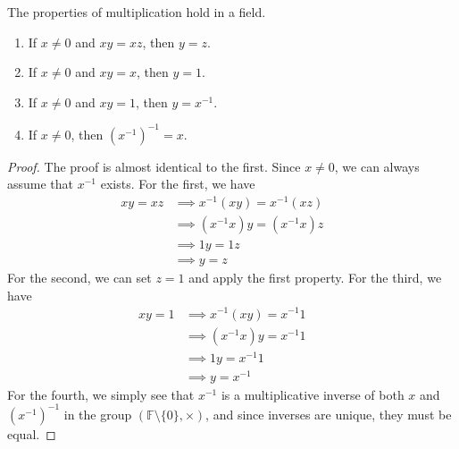   \begin{lemma}
    The properties of multiplication hold in a field. 
    \begin{enumerate}
      \item If $x \neq 0$ and $xy = xz$, then $y = z$. 
      \item If $x \neq 0$ and $xy = x$, then $y = 1$. 
      \item If $x \neq 0$ and $xy = 1$, then $y = x^{-1}$. 
      \item If $x \neq 0$, then $(x^{-1})^{-1} = x$. 
    \end{enumerate}
  \end{lemma}
  \begin{proof}
    The proof is almost identical to the first. Since $x \neq 0$, we can always assume that $x^{-1}$ exists. For the first, we have
    \begin{align}
      x y = x z & \implies x^{-1} (x y) = x^{-1} (x z) && \tag{multiplication is a function} \\
                & \implies (x^{-1} x) y = (x^{-1} x) z && \tag{$\times$ is associative} \\
                & \implies 1 y = 1 z && \tag{definition of multiplicative inverse} \\  
                & \implies y = z && \tag{definition of identity}
    \end{align}
    For the second, we can set $z = 1$ and apply the first property. For the third, we have 
    \begin{align}
      xy = 1 & \implies x^{-1} (x y) = x^{-1} 1 && \tag{multiplication is a function} \\
             & \implies (x^{-1} x) y = x^{-1} 1 && \tag{$\times$ is associative} \\
             & \implies 1 y = x^{-1} 1 && \tag{definition of multiplicative inverse} \\
             & \implies y = x^{-1} && \tag{definition of identity}
    \end{align}
    For the fourth, we simply see that $x^{-1}$ is a multiplicative inverse of both $x$ and $(x^{-1})^{-1}$ in the group $(\mathbb{F} \setminus \{0\}, \times)$, and since inverses are unique, they must be equal. 
  \end{proof}

